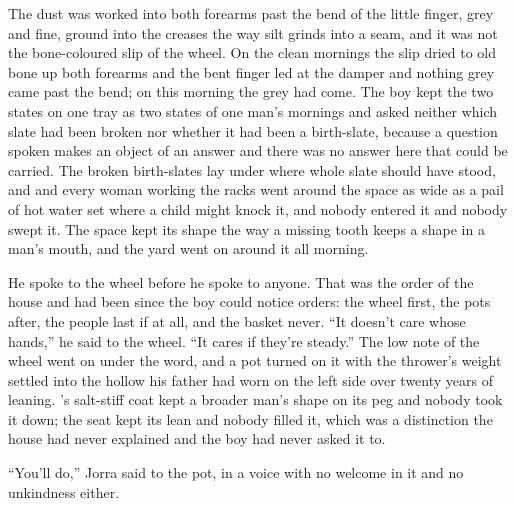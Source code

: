 The dust was worked into both forearms past the bend of the little finger, grey and fine, ground into the creases the way silt grinds into a seam, and it was not the bone-coloured slip of the wheel. On the clean mornings the slip dried to old bone up both forearms and the bent finger led at the damper and nothing grey came past the bend; on this morning the grey had come. The boy kept the two states on one tray as two states of one man's mornings and asked neither which slate had been broken nor whether it had been a birth-slate, because a question spoken makes an object of an answer and there was no answer here that could be carried. The broken birth-slates lay under  where whole slate should have stood, and  and every woman working the racks went around the space as wide as a pail of hot water set where a child might knock it, and nobody entered it and nobody swept it. The space kept its shape the way a missing tooth keeps a shape in a man's mouth, and the yard went on around it all morning.

He spoke to the wheel before he spoke to anyone. That was the order of the house and had been since the boy could notice orders: the wheel first, the pots after, the people last if at all, and the basket never. “It doesn’t care whose hands,” he said to the wheel. “It cares if they’re steady.” The low note of the wheel went on under the word, and a pot turned on it with the thrower's weight settled into the hollow his father had worn on the left side over twenty years of leaning. 's salt-stiff coat kept a broader man's shape on its peg and nobody took it down; the seat kept its lean and nobody filled it, which was a distinction the house had never explained and the boy had never asked it to.

“You’ll do,” Jorra said to the pot, in a voice with no welcome in it and no unkindness either.

